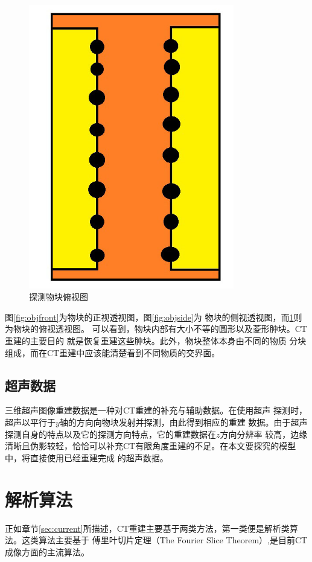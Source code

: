 \begin{figure}[h!]
\center
\includegraphics[width=0.8\textwidth]{figure/object/top}
\caption{探测物块俯视图}\label{fig:objtop}
\end{figure}
图\ref{fig:objfront}为物块的正视透视图，图\ref{fig:objside}为
物块的侧视透视图，而\ref{fig:objtop}则为物块的俯视透视图。
可以看到，物块内部有大小不等的圆形以及菱形肿块。CT重建的主要目的
就是恢复重建这些肿块。此外，物块整体本身由不同的物质
分块组成，而在CT重建中应该能清楚看到不同物质的交界面。

\subsection{超声数据}
三维超声图像重建数据是一种对CT重建的补充与辅助数据。在使用超声
探测时，超声以平行于$y$轴的方向向物块发射并探测，由此得到相应的重建
数据。由于超声探测自身的特点以及它的探测方向特点，它的重建数据在$z$方向分辨率
较高，边缘清晰且伪影较轻，恰恰可以补充CT有限角度重建的不足。在本文要探究的模型中，将直接使用已经重建完成
的超声数据。

\section{解析算法}
正如章节\ref{sec:current}所描述，CT重建主要基于两类方法，第一类便是解析类算法。这类算法主要基于
傅里叶切片定理（The Fourier Slice Theorem）\cite{bracewell1986fourier},是目前CT成像方面的主流算法。
